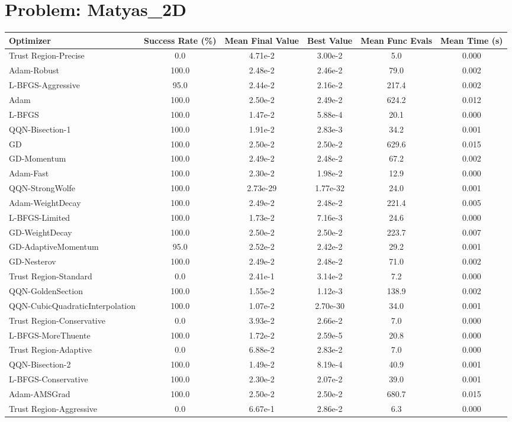 \documentclass{article}
\begin{document}
\section{Problem: Matyas\_2D}
\begin{longtable}{p{3cm}*{5}{c}}
\toprule
\textbf{Optimizer} & \textbf{Success Rate (\%)} & \textbf{Mean Final Value} & \textbf{Best Value} & \textbf{Mean Func Evals} & \textbf{Mean Time (s)} \\
\midrule
Trust Region-Precise & 0.0 & 4.71e-2 & 3.00e-2 & 5.0 & 0.000 \\
Adam-Robust & 100.0 & 2.48e-2 & 2.46e-2 & 79.0 & 0.002 \\
L-BFGS-Aggressive & 95.0 & 2.44e-2 & 2.16e-2 & 217.4 & 0.002 \\
Adam & 100.0 & 2.50e-2 & 2.49e-2 & 624.2 & 0.012 \\
L-BFGS & 100.0 & 1.47e-2 & 5.88e-4 & 20.1 & 0.000 \\
QQN-Bisection-1 & 100.0 & 1.91e-2 & 2.83e-3 & 34.2 & 0.001 \\
GD & 100.0 & 2.50e-2 & 2.50e-2 & 629.6 & 0.015 \\
GD-Momentum & 100.0 & 2.49e-2 & 2.48e-2 & 67.2 & 0.002 \\
Adam-Fast & 100.0 & 2.30e-2 & 1.98e-2 & 12.9 & 0.000 \\
QQN-StrongWolfe & 100.0 & 2.73e-29 & 1.77e-32 & 24.0 & 0.001 \\
Adam-WeightDecay & 100.0 & 2.49e-2 & 2.48e-2 & 221.4 & 0.005 \\
L-BFGS-Limited & 100.0 & 1.73e-2 & 7.16e-3 & 24.6 & 0.000 \\
GD-WeightDecay & 100.0 & 2.50e-2 & 2.50e-2 & 223.7 & 0.007 \\
GD-AdaptiveMomentum & 95.0 & 2.52e-2 & 2.42e-2 & 29.2 & 0.001 \\
GD-Nesterov & 100.0 & 2.49e-2 & 2.48e-2 & 71.0 & 0.002 \\
Trust Region-Standard & 0.0 & 2.41e-1 & 3.14e-2 & 7.2 & 0.000 \\
QQN-GoldenSection & 100.0 & 1.55e-2 & 1.12e-3 & 138.9 & 0.002 \\
QQN-CubicQuadraticInterpolation & 100.0 & 1.07e-2 & 2.70e-30 & 34.0 & 0.001 \\
Trust Region-Conservative & 0.0 & 3.93e-2 & 2.66e-2 & 7.0 & 0.000 \\
L-BFGS-MoreThuente & 100.0 & 1.72e-2 & 2.59e-5 & 20.8 & 0.000 \\
Trust Region-Adaptive & 0.0 & 6.88e-2 & 2.83e-2 & 7.0 & 0.000 \\
QQN-Bisection-2 & 100.0 & 1.49e-2 & 8.19e-4 & 40.9 & 0.001 \\
L-BFGS-Conservative & 100.0 & 2.30e-2 & 2.07e-2 & 39.0 & 0.001 \\
Adam-AMSGrad & 100.0 & 2.50e-2 & 2.50e-2 & 680.7 & 0.015 \\
Trust Region-Aggressive & 0.0 & 6.67e-1 & 2.86e-2 & 6.3 & 0.000 \\
\bottomrule
\end{longtable}
\end{document}
